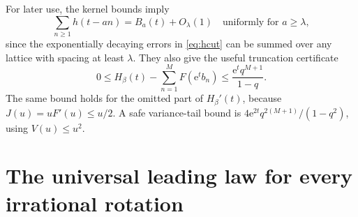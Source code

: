 \documentclass[11pt,a4paper]{article}
\theoremstyle{definition}
\theoremstyle{remark}\newtheorem{remark}[theorem]{Remark}
\newcommand{\e}{\mathrm e}
\begin{document}
For later use, the kernel bounds imply
\begin{equation}
 \sum_{n\ge1}h(t-an)=B_a(t)+O_\lambda(1)
 \quad\text{uniformly for }a\ge\lambda,
 \label{eq:scalarcut}
\end{equation}
since the exponentially decaying errors in \eqref{eq:hcut} can be summed over
any lattice with spacing at least $\lambda$.  They also give the useful
truncation certificate
\begin{equation}
 0\le H_\beta(t)-\sum_{n=1}^{M}F(\e^t b_n)
 \le\frac{\e^tq^{M+1}}{1-q}.
 \label{eq:tail}
\end{equation}
The same bound holds for the omitted part of $H_\beta'(t)$, because
$J(u)=uF'(u)\le u/2$.  A safe variance-tail bound is
$4\e^{2t}q^{2(M+1)}/(1-q^2)$, using $V(u)\le u^2$.

\section{The universal leading law for every irrational rotation}
\label{sec:universal}
\end{document}

